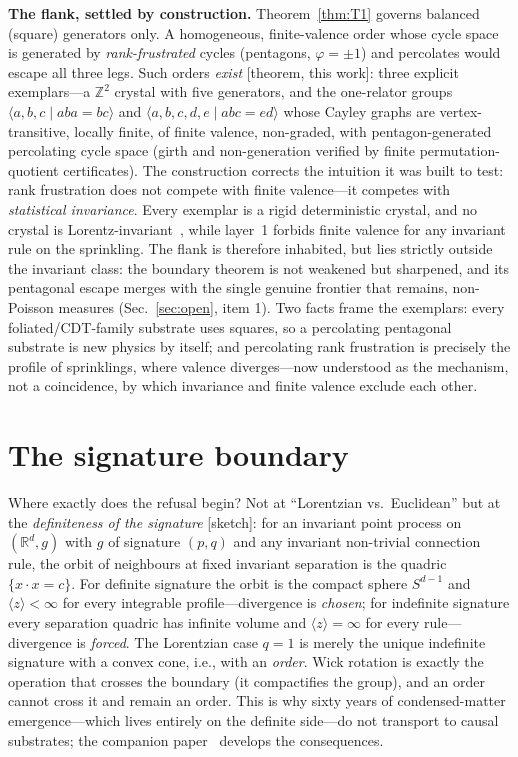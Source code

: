 \documentclass[aps,prd,reprint,nofootinbib,superscriptaddress,floatfix]{revtex4-2}
\theoremstyle{definition}
\begin{document}
\noindent\textbf{The flank, settled by construction.} Theorem~\ref{thm:T1} governs
balanced (square) generators only. A homogeneous, finite-valence order whose cycle space
is generated by \emph{rank-frustrated} cycles (pentagons, $\varphi=\pm1$) and percolates
would escape all three legs. Such orders \emph{exist} [theorem, this work]: three
explicit exemplars---a $\mathbb{Z}^2$ crystal with five generators, and the one-relator
groups $\langle a,b,c\mid aba{=}bc\rangle$ and $\langle a,b,c,d,e\mid abc{=}ed\rangle$
whose Cayley graphs are vertex-transitive, locally finite, of finite valence, non-graded,
with pentagon-generated percolating cycle space (girth and non-generation verified by
finite permutation-quotient certificates). The construction corrects the intuition it was
built to test: rank frustration does not compete with finite valence---it competes with
\emph{statistical invariance}. Every exemplar is a rigid deterministic crystal, and no
crystal is Lorentz-invariant~\cite{BHS2009}, while layer~1 forbids finite valence for any
invariant rule on the sprinkling. The flank is therefore inhabited, but lies strictly
outside the invariant class: the boundary theorem is not weakened but sharpened, and its
pentagonal escape merges with the single genuine frontier that remains, non-Poisson
measures (Sec.~\ref{sec:open}, item 1). Two facts frame the exemplars: every
foliated/CDT-family substrate uses squares, so a percolating pentagonal substrate is new
physics by itself; and percolating rank frustration is precisely the profile of
sprinklings, where valence diverges---now understood as the mechanism, not a coincidence,
by which invariance and finite valence exclude each other.

\section{The signature boundary}
\label{sec:signature}

Where exactly does the refusal begin? Not at ``Lorentzian vs.\ Euclidean'' but at the
\emph{definiteness of the signature} [sketch]: for an invariant point process on
$(\mathbb{R}^d,g)$ with $g$ of signature $(p,q)$ and any invariant non-trivial connection
rule, the orbit of neighbours at fixed invariant separation is the quadric
$\{x\!\cdot\!x=c\}$. For definite signature the orbit is the compact sphere $S^{d-1}$
and $\langle z\rangle<\infty$ for every integrable profile---divergence is
\emph{chosen}; for indefinite signature every separation quadric has infinite volume and
$\langle z\rangle=\infty$ for every rule---divergence is \emph{forced}. The Lorentzian
case $q=1$ is merely the unique indefinite signature with a convex cone, i.e., with an
\emph{order}. Wick rotation is exactly the operation that crosses the boundary (it
compactifies the group), and an order cannot cross it and remain an order. This is why
sixty years of condensed-matter emergence---which lives entirely on the definite
side---do not transport to causal substrates; the companion paper~\cite{WenComplement}
develops the consequences.
\end{document}
